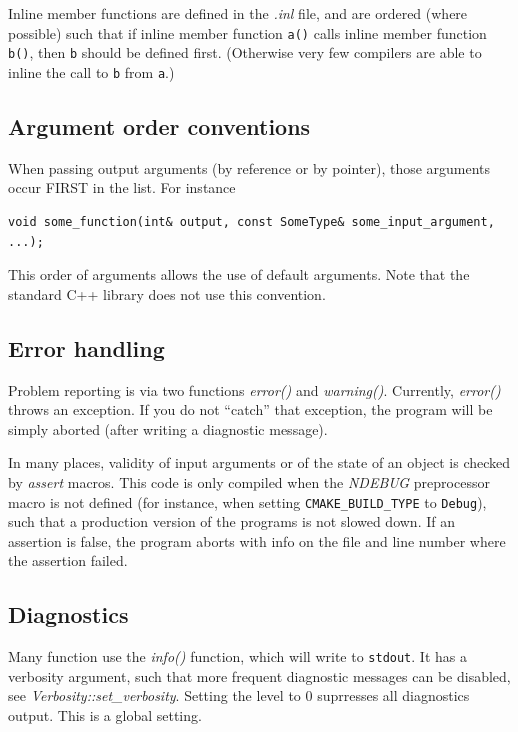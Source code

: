 \documentclass{article}
\begin{document}
Inline member functions are defined in the \textit{.inl} file, and 
are ordered (where possible) such that if inline member function 
\texttt{a()} calls inline member function \texttt{b()}, 
then \texttt{b} should be defined first. (Otherwise very 
few compilers are able to inline the call to \texttt{b}
from \texttt{a}.)



\subsection{
Argument order conventions}

When passing output arguments (by reference or by pointer), those 
arguments occur FIRST in the list. For instance
\begin{verbatim}
void some_function(int& output, const SomeType& some_input_argument, ...);
\end{verbatim}


This order of arguments allows the use of default arguments. 
Note that the standard C++ library does not use this convention.

\subsection{
Error handling }

Problem reporting is via two functions \textit{error()} and \textit{warning()}. 
Currently, \textit{error()} throws an exception. If you do not ``catch'' that
exception, the program will be simply aborted (after writing 
a diagnostic message). 

In many places, validity of input arguments or of the state of 
an object is checked by \textit{assert} macros. This code is only 
compiled when the \textit{NDEBUG} preprocessor macro is not defined (for instance,
when setting \texttt{CMAKE\_BUILD\_TYPE} to \texttt{Debug}), 
such that a production version of the programs 
is not slowed down. If an assertion is false, the program aborts 
with info on the file and line number where the assertion failed.

\subsection{Diagnostics}
Many function use the \textit{info()} function, which will write to
\texttt{stdout}. It has a verbosity argument, such that more frequent
diagnostic messages can be disabled, see \textit{Verbosity::set\_verbosity}.
Setting the level to 0 suprresses all diagnostics output. This is a global setting.
\end{document}
